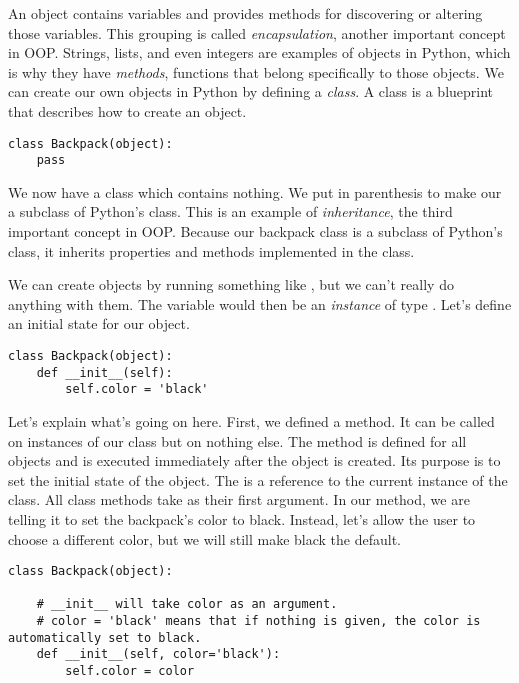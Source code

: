 An object contains variables and provides methods for discovering or altering those variables.
This grouping is called \emph{encapsulation}, another important concept in OOP.
Strings, lists, and even integers are examples of objects in Python, which is why they have \emph{methods}, functions that belong specifically to those objects.
We can create our own objects in Python by defining a \emph{class}.
A class is a blueprint that describes how to create an object.

\begin{lstlisting}
class Backpack(object):
    pass
\end{lstlisting}

We now have a class  which contains nothing.
We put  in parenthesis to make our  a subclass of Python's  class.
This is an example of \emph{inheritance}, the third important concept in OOP.
Because our backpack class is a subclass of Python's  class, it inherits properties and methods implemented in the  class.

We can create  objects by running something like , but we can't really do anything with them.
The variable  would then be an \emph{instance} of type .
Let's define an initial state for our object.

\begin{lstlisting}
class Backpack(object):
    def __init__(self):
        self.color = 'black'
\end{lstlisting}

Let's explain what's going on here.
First, we defined a method.
It can be called on instances of our class but on nothing else.
The  method is defined for all objects and is executed immediately after the object is created.
Its purpose is to set the initial state of the object.
The  is a reference to the current instance of the class.
All class methods take  as their first argument.
In our  method, we are telling it to set the backpack's color to black.
Instead, let's allow the user to choose a different color, but we will still make black the default.

\begin{lstlisting}
class Backpack(object):

    # __init__ will take color as an argument.
    # color = 'black' means that if nothing is given, the color is automatically set to black.
    def __init__(self, color='black'):
        self.color = color
\end{lstlisting}

